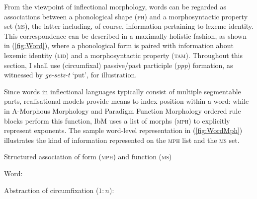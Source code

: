 \documentclass[output=paper,biblatex,babelshorthands,newtxmath,draftmode,colorlinks,citecolor=brown]{langscibook}
\begin{document}
\begin{exe}
\begin{xlist}
\begin{exe}
\end{exe}

From the viewpoint of inflectional morphology, words can be regarded
as associations between a phonological shape (\textsc{ph}) and a
morphosyntactic property set (\textsc{ms}), the latter including, of
course, information pertaining to lexeme identity. This correspondence
can be described in a maximally holistic fashion, as shown in 
(\ref{fig:Word}), where a phonological form is paired with information
about lexemic identity (\textsc{lid}) and a morphosyntactic property (\textsc{tam}). Throughout this section, I shall use 
(circumfixal) passive/past participle (\emph{ppp}) formation, as
witnessed by \textit{ge-\emph{setz}-t} `put', for illustration.

\begin{exe}
  \ex
  
  \label{fig:Word}
\end{exe}

Since words in inflectional languages typically consist of multiple
segment\-able parts, realisational models provide means to index
position within a word: while in A-Morphous Morphology
\citep[=AM;][]{Anderson92} and Paradigm Function Morphology
\citep[=PFM;][]{Stump01} ordered rule blocks perform this function, IbM
uses a list of morphs (\textsc{mph}) to explicitly represent
exponents.
The sample word-level representation in (\ref{fig:WordMph})
illustrates the kind of information represented on the \textsc{mph}
list and the \textsc{ms} set. 
\begin{exe}
  \ex Structured association of form (\textsc{mph}) and function (\textsc{ms})   \label{fig:WordMph}

  \begin{xlist}
    \ex Word:

    \ex Abstraction of circumfixation ($1:n$):


\end{xlist}
\end{exe}
\end{xlist}
\end{exe}
\end{document}
